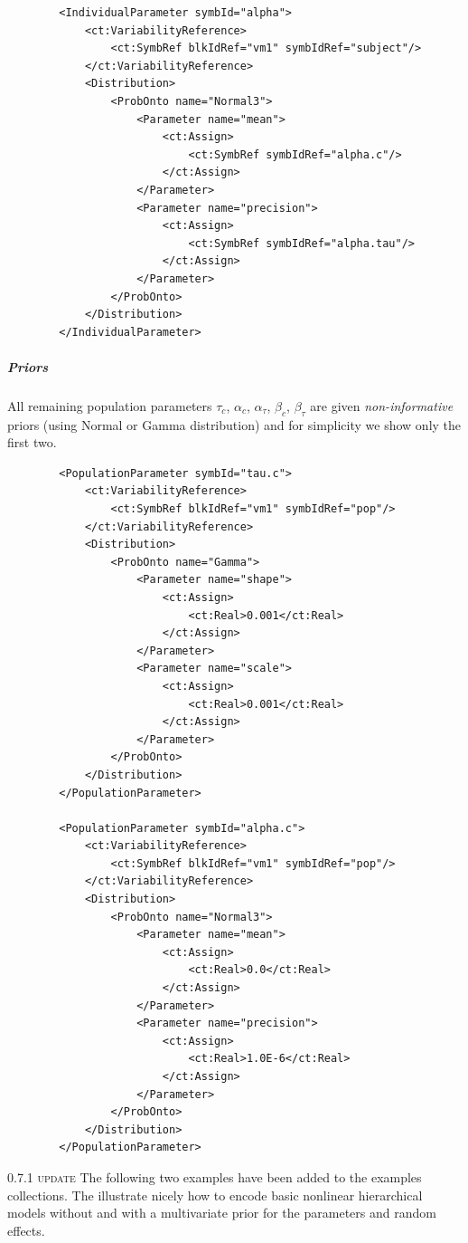 \lstset{language=XML}
\begin{lstlisting}
        <IndividualParameter symbId="alpha">
            <ct:VariabilityReference>
                <ct:SymbRef blkIdRef="vm1" symbIdRef="subject"/>
            </ct:VariabilityReference>
            <Distribution>
                <ProbOnto name="Normal3">
                    <Parameter name="mean">
                        <ct:Assign>
                            <ct:SymbRef symbIdRef="alpha.c"/>
                        </ct:Assign>
                    </Parameter>
                    <Parameter name="precision">
                        <ct:Assign>
                            <ct:SymbRef symbIdRef="alpha.tau"/>
                        </ct:Assign>
                    </Parameter>
                </ProbOnto>
            </Distribution>
        </IndividualParameter>
\end{lstlisting}
\subparagraph{Priors} All remaining population parameters $\tau_c$, $\alpha_c$, 
$\alpha_{\tau}$, $\beta_c$, $\beta_{\tau}$ are given \emph{non-informative} 
priors (using Normal or Gamma distribution) and for simplicity we show only the first two.
\lstset{language=XML}
\begin{lstlisting}
        <PopulationParameter symbId="tau.c">
            <ct:VariabilityReference>
                <ct:SymbRef blkIdRef="vm1" symbIdRef="pop"/>
            </ct:VariabilityReference>
            <Distribution>
                <ProbOnto name="Gamma">
                    <Parameter name="shape">
                        <ct:Assign>
                            <ct:Real>0.001</ct:Real>
                        </ct:Assign>
                    </Parameter>
                    <Parameter name="scale">
                        <ct:Assign>
                            <ct:Real>0.001</ct:Real>
                        </ct:Assign>
                    </Parameter>
                </ProbOnto>
            </Distribution>
        </PopulationParameter>
        
        <PopulationParameter symbId="alpha.c">
            <ct:VariabilityReference>
                <ct:SymbRef blkIdRef="vm1" symbIdRef="pop"/>
            </ct:VariabilityReference>
            <Distribution>
                <ProbOnto name="Normal3">
                    <Parameter name="mean">
                        <ct:Assign>
                            <ct:Real>0.0</ct:Real>
                        </ct:Assign>
                    </Parameter>
                    <Parameter name="precision">
                        <ct:Assign>
                            <ct:Real>1.0E-6</ct:Real>
                        </ct:Assign>
                    </Parameter>
                </ProbOnto>
            </Distribution>
        </PopulationParameter>
\end{lstlisting}
{\color{red} \scshape{0.7.1 update}} The following two examples have been
added to the examples collections. The illustrate nicely how to encode basic nonlinear 
hierarchical models without and with a multivariate prior for the parameters and random effects. 

